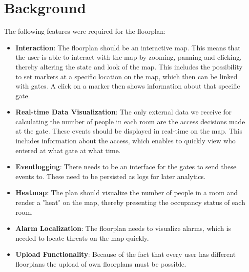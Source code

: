 \section{Background}

The following features were required for the floorplan:

\begin{itemize}
	\item \textbf{Interaction}:
	The floorplan should be an interactive map. This means that the user is able to interact with the map by zooming, panning and clicking, thereby altering the state and look of the map. This includes the possibility to set markers at a specific location on the map, which then can be linked with gates. A click on a marker then shows information about that specific gate.
	\item \textbf{Real-time Data Visualization}:
	The only external data we receive for calculating the number of people in each room are the access decisions made at the gate. These events should be displayed in real-time on the map. This includes information about the access, which enables to quickly view who entered at what gate at what time.
	\item \textbf{Eventlogging}:
	There needs to be an interface for the gates to send these events to. These need to be persisted as logs for later analytics.
	\item \textbf{Heatmap}:
	The plan should visualize the number of people in a room and render a "heat" on the map, thereby presenting the occupancy status of each room.
	\item \textbf{Alarm Localization}:
	The floorplan needs to visualize alarms, which is needed to locate threats on the map quickly.
	\item \textbf{Upload Functionality}:
	Because of the fact that every user has different floorplans the upload of own floorplans must be possible.
\end{itemize}

\clearpage